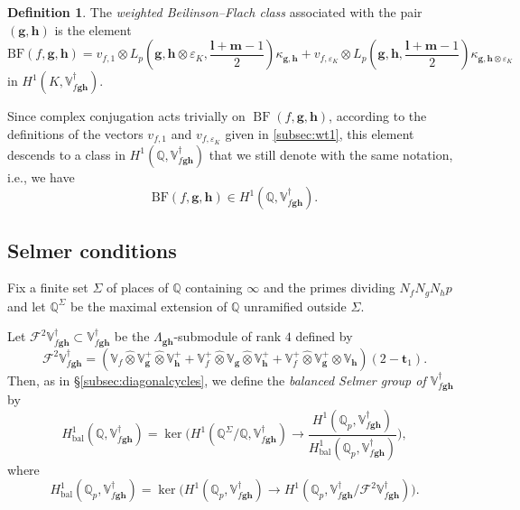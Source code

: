 \documentclass[a4paper,11pt]{amsart}
\theoremstyle{plain}
\theoremstyle{definition}
\newtheorem{defi}[theorem]{Definition}
\theoremstyle{remark}
\newcommand{\bb}{\mathbb}
\DeclareMathOperator{\BF}{BF}
\DeclareMathOperator{\bal}{bal}
\newcommand{\hg}{{\mathbf{g}}}
\newcommand{\hh}{{\mathbf h}}
\numberwithin{equation}{section}
\begin{document}

\begin{defi}
The \emph{weighted Beilinson--Flach class} associated with the pair $(\hg,\hh)$ is the element
\[
\mathrm{BF}(f,\hg,\hh)=v_{f,1}\otimes L_p\left(\hg,\hh\otimes\varepsilon_K,\frac{\mathbf{l}+\mathbf{m}-1}{2}\right)\kappa_{\hg,\hh}+ v_{f,\varepsilon_K} \otimes L_p\left(\hg,\hh,\frac{\mathbf{l}+\mathbf{m}-1}{2}\right)\kappa_{\hg,\hh\otimes\varepsilon_K}
\]
in $H^1(K,\bb{V}_{f\hg\hh}^\dagger)$.   
\end{defi}
 
Since complex conjugation acts trivially on $\BF(f, \hg, \hh)$, according to the definitions of the vectors $v_{f,1}$ and $v_{f,\varepsilon_K}$ given in \ref{subsec:wt1}, %
this element descends to a class in $H^1(\mathbb Q, \bb{V}_{f\hg\hh}^\dagger)$ that we still denote with the same notation, i.e., we have
\[ 
\mathrm{BF}(f,\hg,\hh) \in H^1(\mathbb Q, \bb{V}_{f\hg \hh}^\dagger).
\]

\subsection{Selmer conditions}\label{subsec:Selmergroups}

Fix a finite set $\Sigma$ of places of $\mathbb Q$ containing $\infty$ and the primes dividing $N_fN_gN_hp$ and let $\mathbb Q^\Sigma$ be the maximal extension of $\mathbb Q$ unramified outside $\Sigma$.

Let $\mathscr{F}^2\bb{V}_{f\hg\hh}^\dagger\subset \bb{V}_{f\hg\hh}^\dagger$ be the $\Lambda_{\hg\hh}$-submodule of rank $4$ defined by
\[
\mathscr{F}^2\mathbb V_{f\hg\hh}^\dag=(\bb{V}_f\hat{\otimes}\bb{V}_{\hg}^+\hat{\otimes}\bb{V}_{\hh}^+ +\bb{V}_f^+\hat{\otimes}\bb{V}_{\hg}\hat{\otimes}\bb{V}_{\hh}^+ +\bb{V}_f^+\hat{\otimes}\bb{V}_{\hg}^+\hat{\otimes}\bb{V}_{\hh})(2-\mathbf{t}_1).
\]
Then, as in \S\ref{subsec:diagonalcycles}, we define the \textit{balanced Selmer group of $\bb{V}_{f\hg\hh}^\dagger$} by
\[
H^1_{\bal}(\bb{Q},\mathbb V_{f \hg \hh}^{\dag}) = \ker \bigg(
H^1(\mathbb Q^\Sigma/\mathbb Q, \mathbb V_{f \hg \hh}^{\dag}) \longrightarrow
\frac{H^1(\mathbb Q_p,\mathbb V_{f \hg \hh}^\dag)}{H^1_{\bal}(\bb{Q}_p,\mathbb V_{f \hg \hh}^\dag)}\bigg),
\]
where
\[
H^1_{\bal}(\bb{Q}_p,\mathbb V_{f \hg \hh}^\dag)=\ker \big(H^1(\mathbb Q_p, \mathbb V_{f \hg \hh}^{\dag}) \longrightarrow H^1(\mathbb Q_p, \mathbb V_{f \hg \hh}^{\dag}/\mathscr{F}^2\mathbb V_{f \hg \hh}^{\dag}) \big).
\]
\end{document}
